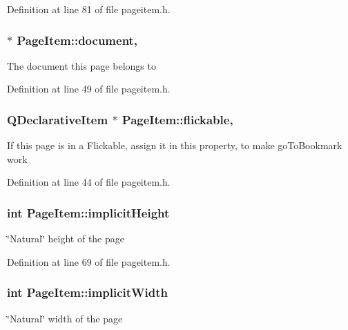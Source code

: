 Definition at line 81 of file pageitem.\+h.

\hypertarget{classPageItem_aeacd9cae2d50dc7f416201020750b7aa}{
\subsubsection[{document}]{ $\ast$ Page\+Item\+::document\hspace{0.3cm}{\ttfamily [read]}, {\ttfamily [write]}}}\label{classPageItem_aeacd9cae2d50dc7f416201020750b7aa}
The document this page belongs to 

Definition at line 49 of file pageitem.\+h.

\hypertarget{classPageItem_af39792e2ec4115ad25422269a02bd1f2}{
\subsubsection[{flickable}]{\setlength{\rightskip}{0pt plus 5cm}Q\+Declarative\+Item $\ast$ Page\+Item\+::flickable\hspace{0.3cm}{\ttfamily [read]}, {\ttfamily [write]}}}\label{classPageItem_af39792e2ec4115ad25422269a02bd1f2}
If this page is in a Flickable, assign it in this property, to make go\+To\+Bookmark work 

Definition at line 44 of file pageitem.\+h.

\hypertarget{classPageItem_a8a1c86f9d73839b632d4618a4884ef53}{
\subsubsection[{implicit\+Height}]{\setlength{\rightskip}{0pt plus 5cm}int Page\+Item\+::implicit\+Height\hspace{0.3cm}{\ttfamily [read]}}}\label{classPageItem_a8a1c86f9d73839b632d4618a4884ef53}
\char`\"{}\+Natural\char`\"{} height of the page 

Definition at line 69 of file pageitem.\+h.

\hypertarget{classPageItem_a36e15ae9b525487c1008736d4e5adba7}{
\subsubsection[{implicit\+Width}]{\setlength{\rightskip}{0pt plus 5cm}int Page\+Item\+::implicit\+Width\hspace{0.3cm}{\ttfamily [read]}}}\label{classPageItem_a36e15ae9b525487c1008736d4e5adba7}
\char`\"{}\+Natural\char`\"{} width of the page 


